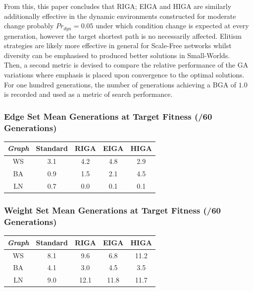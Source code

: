\documentclass[
	a4paper, %
	10pt, %
	unnumberedsections, %
	twoside, %
]{LTJournalArticle}
\begin{document}
From this, this paper concludes that RIGA; EIGA and HIGA are similarly additionally  effective in the dynamic environments constructed for moderate change probably \(Pr_{dyn} = 0.05\) under which condition change is expected at every generation, however the target shortest path is no necessarily affected. Elitism strategies are likely more effective in general for Scale-Free networks whilst diversity can be emphasised to produced better solutions in Small-Worlds. \\ 

Then, a second metric is devised to compare the relative performance of the GA variations where emphasis is placed upon convergence to the optimal solutions. For one hundred generations, the number of generations achieving a BGA of \(1.0\) is recorded and used as a metric of search performance. 

\subsubsection{Edge Set Mean Generations at Target Fitness (/60 Generations)}
\begin{center}
\begin{tabular}{||c c c c c||} 
 \hline
 \emph{Graph} & Standard & RIGA & EIGA & HIGA \\ [0.5ex] 
 \hline\hline
 WS & 3.1 & 4.2 & 4.8 & 2.9 \\ 
 \hline
 BA & 0.9 & 1.5 & 2.1 & 4.5 \\
 \hline
 LN & 0.7 & 0.0 & 0.1 & 0.1 \\
\end{tabular}
\end{center}

\subsubsection{Weight Set Mean Generations at Target Fitness (/60 Generations)} 

\begin{center}
\begin{tabular}{||c c c c c||} 
 \hline
 \emph{Graph} & Standard & RIGA & EIGA & HIGA \\ [0.5ex] 
 \hline\hline
 WS & 8.1 & 9.6 & 6.8 & 11.2 \\ 
 \hline
 BA & 4.1 & 3.0 & 4.5 & 3.5 \\
 \hline
 LN & 9.0 & 12.1 & 11.8 & 11.7 \\
\end{tabular}
\end{center}
\end{document}
